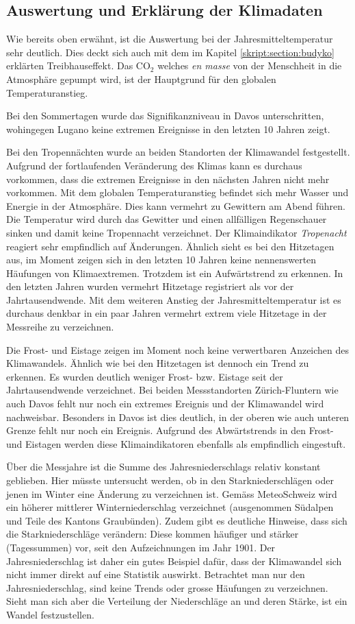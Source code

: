 \begin{refsection}
\subsection{Auswertung und Erklärung der Klimadaten}
Wie bereits oben erwähnt, ist die Auswertung bei der Jahresmitteltemperatur sehr deutlich.  Dies deckt sich auch mit dem im Kapitel \ref{skript:section:budyko} erklärten Treibhauseffekt. Das CO$_2$ welches \textit{en masse} von der Menschheit in die Atmosphäre gepumpt wird, ist der Hauptgrund für den globalen Temperaturanstieg.

Bei den Sommertagen wurde das Signifikanzniveau in Davos unterschritten, wohingegen Lugano keine extremen Ereignisse in den letzten 10 Jahren zeigt. 

Bei den Tropennächten wurde an beiden Standorten der Klimawandel festgestellt. Aufgrund der fortlaufenden Veränderung des Klimas kann es durchaus vorkommen, dass die extremen Ereignisse in den nächsten Jahren nicht mehr vorkommen. Mit dem globalen Temperaturanstieg befindet sich mehr Wasser und Energie in der Atmosphäre. Dies kann vermehrt zu Gewittern am Abend führen. Die Temperatur wird durch das Gewitter und einen allfälligen Regenschauer sinken und damit keine Tropennacht verzeichnet. Der Klimaindikator \textit{Tropenacht} reagiert sehr empfindlich auf Änderungen.
%
Ähnlich sieht es bei den Hitzetagen aus, im Moment zeigen sich in den letzten 10 Jahren keine nennenswerten Häufungen von Klimaextremen. Trotzdem ist ein Aufwärtstrend zu erkennen. In den letzten Jahren wurden vermehrt Hitzetage registriert als vor der Jahrtausendwende. Mit dem weiteren Anstieg der Jahresmitteltemperatur ist es durchaus denkbar in ein paar Jahren vermehrt extrem viele Hitzetage in der Messreihe zu verzeichnen.

Die Frost- und Eistage zeigen im Moment noch keine verwertbaren Anzeichen des Klimawandels. Ähnlich wie bei den Hitzetagen ist dennoch ein Trend zu erkennen. Es wurden deutlich weniger Frost- bzw. Eistage seit der Jahrtausendwende verzeichnet. Bei beiden Messstandorten Zürich-Fluntern wie auch Davos fehlt nur noch ein extremes Ereignis und der Klimawandel wird nachweisbar. Besonders in Davos ist dies deutlich, in der oberen wie auch unteren Grenze fehlt nur noch ein Ereignis. Aufgrund des Abwärtstrends in den Frost- und Eistagen werden diese Klimaindikatoren ebenfalls als empfindlich eingestuft.

Über die Messjahre ist die Summe des Jahresniederschlags relativ konstant geblieben. Hier müsste untersucht werden, ob in den Starkniederschlägen oder jenen im Winter eine Änderung zu verzeichnen ist. Gemäss MeteoSchweiz wird ein höherer mittlerer Winterniederschlag verzeichnet (ausgenommen Südalpen und Teile des Kantons Graubünden). Zudem gibt es deutliche Hinweise, dass sich die Starkniederschläge verändern: Diese kommen häufiger und stärker (Tagessummen) vor, seit den Aufzeichnungen im Jahr 1901. Der Jahresniederschlag ist daher ein gutes Beispiel dafür, dass der Klimawandel sich nicht immer direkt auf eine Statistik auswirkt. Betrachtet man nur den Jahresniederschlag, sind keine Trends oder grosse Häufungen zu verzeichnen. Sieht man sich aber die Verteilung der Niederschläge an und deren Stärke, ist ein Wandel festzustellen.


\end{refsection}
